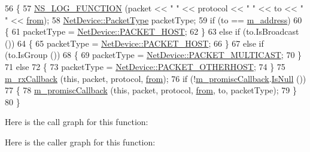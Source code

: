 \begin{DoxyCode}
56 \{
57   \hyperlink{log-macros-disabled_8h_a90b90d5bad1f39cb1b64923ea94c0761}{NS\_LOG\_FUNCTION} (packet << \textcolor{stringliteral}{" "} << protocol << \textcolor{stringliteral}{" "} << to << \textcolor{stringliteral}{" "} << 
      \hyperlink{lte__amc_8m_a1b4c81ff74eb1a626b5ade44c81004b3}{from});
58   \hyperlink{classns3_1_1NetDevice_ace65153f09144f55a0d3e702fc29d6b2}{NetDevice::PacketType} packetType;
59   \textcolor{keywordflow}{if} (to == \hyperlink{classns3_1_1LoopbackNetDevice_a7d692338d3d7b73fd73f8b182af36d6b}{m\_address})
60     \{
61       packetType = \hyperlink{classns3_1_1NetDevice_ace65153f09144f55a0d3e702fc29d6b2a60835731aced24ac0c712ba61e62462e}{NetDevice::PACKET\_HOST};
62     \}
63   \textcolor{keywordflow}{else} \textcolor{keywordflow}{if} (to.IsBroadcast ())
64     \{
65       packetType = \hyperlink{classns3_1_1NetDevice_ace65153f09144f55a0d3e702fc29d6b2a60835731aced24ac0c712ba61e62462e}{NetDevice::PACKET\_HOST};
66     \}
67   \textcolor{keywordflow}{else} \textcolor{keywordflow}{if} (to.IsGroup ())
68     \{
69       packetType = \hyperlink{classns3_1_1NetDevice_ace65153f09144f55a0d3e702fc29d6b2ae3ffb88d364e97f06f662f5d7ba53bbe}{NetDevice::PACKET\_MULTICAST};
70     \}
71   \textcolor{keywordflow}{else} 
72     \{
73       packetType = \hyperlink{classns3_1_1NetDevice_ace65153f09144f55a0d3e702fc29d6b2a60c00fab4286dd2903e2b197a9f8c6c8}{NetDevice::PACKET\_OTHERHOST};
74     \}
75   \hyperlink{classns3_1_1LoopbackNetDevice_a844fcc47c3dc1be07aed83c8ba70a7b0}{m\_rxCallback} (\textcolor{keyword}{this}, packet, protocol, \hyperlink{lte__amc_8m_a1b4c81ff74eb1a626b5ade44c81004b3}{from});
76   \textcolor{keywordflow}{if} (!\hyperlink{classns3_1_1LoopbackNetDevice_ac18a33947e9703ed786c83448348414c}{m\_promiscCallback}.\hyperlink{classns3_1_1Callback_aa8e27826badbf37f84763f36f70d9b54}{IsNull} ())
77     \{
78       \hyperlink{classns3_1_1LoopbackNetDevice_ac18a33947e9703ed786c83448348414c}{m\_promiscCallback} (\textcolor{keyword}{this}, packet, protocol, \hyperlink{lte__amc_8m_a1b4c81ff74eb1a626b5ade44c81004b3}{from}, to, packetType);
79     \}
80 \}
\end{DoxyCode}


Here is the call graph for this function\+:




Here is the caller graph for this function\+:


